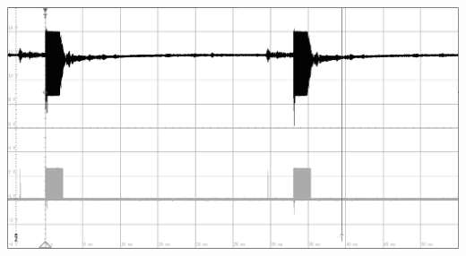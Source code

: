 \begin{minipage}{0.46\textwidth}
\includegraphics[width=1\textwidth%
]{Abbildungen/MessungenP2/10V/5m.PNG}
\end{minipage}\\

